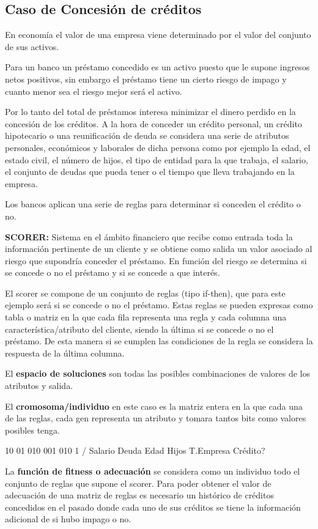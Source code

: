 \documentclass[12pt, twoside, openright]{report} %
\begin{document}
\subsection{Caso de Concesión de créditos}
En economía el valor de una empresa viene determinado por el valor del conjunto de sus activos.

Para un banco un préstamo concedido es un activo puesto que le supone ingresos netos positivos, sin embargo el préstamo tiene un cierto riesgo de impago y cuanto menor sea el riesgo mejor será el activo. 

Por lo tanto del total de préstamos interesa minimizar el dinero perdido en la concesión de los créditos. A la hora de conceder un crédito personal, un crédito hipotecario o una reunificación de deuda se considera una serie de atributos personales, económicos y laborales de dicha persona como por ejemplo la edad, el estado civil, el número de hijos, el tipo de entidad para la que trabaja, el salario, el conjunto de deudas que pueda tener o el tiempo que lleva trabajando en la empresa. 

Los bancos aplican una serie de reglas para determinar si conceden el crédito o no.

\textbf{SCORER:} Sistema en el ámbito financiero que recibe como entrada toda la información pertinente de un cliente y se obtiene como salida un valor asociado al riesgo que supondría conceder el préstamo. En función del riesgo se determina si se concede o no el préstamo y si se concede a que interés. 

El scorer se compone de un conjunto de reglas (tipo if-then), que para este ejemplo será si se concede o no el préstamo. Estas reglas se pueden expresas como tabla o matriz en la que cada fila representa una regla y cada columna una característica/atributo del cliente, siendo la última si se concede o no el préstamo. De esta manera si se cumplen las condiciones de la regla se considera la respuesta de la última columna.

El \textbf{espacio de soluciones} son todas las posibles combinaciones de valores de los atributos y salida.

El \textbf{cromosoma/individuo} en este caso es la matriz entera en la que cada una de las reglas, cada gen representa un atributo y tomara tantos bits como valores posibles tenga.

10 01 010 001 010 1 / Salario Deuda Edad Hijos T.Empresa Crédito?

La \textbf{función de fitness o adecuación} se considera como un individuo todo el conjunto de reglas que supone el scorer. Para poder obtener el valor de adecuación de una matriz de reglas es necesario un histórico de créditos concedidos en el pasado donde cada uno de sus créditos se tiene la información adicional de si hubo impago o no. 
\end{document}
